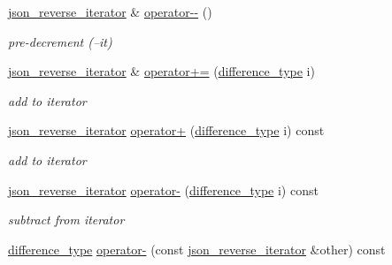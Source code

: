 \begin{DoxyCompactItemize}
\mbox{\hyperlink{classnlohmann_1_1basic__json_1_1json__reverse__iterator}{json\+\_\+reverse\+\_\+iterator}} \& \mbox{\hyperlink{classnlohmann_1_1basic__json_1_1json__reverse__iterator_ae446e535faf6bf4a20d75ffc8525d20d}{operator-\/-\/}} ()
\begin{DoxyCompactList}\small\item\em pre-\/decrement (--it) \end{DoxyCompactList}\item 
\mbox{\hyperlink{classnlohmann_1_1basic__json_1_1json__reverse__iterator}{json\+\_\+reverse\+\_\+iterator}} \& \mbox{\hyperlink{classnlohmann_1_1basic__json_1_1json__reverse__iterator_a3b884d9fc5de7013be144b304df9c068}{operator+=}} (\mbox{\hyperlink{classnlohmann_1_1basic__json_afe7c1303357e19cea9527af4e9a31d8f}{difference\+\_\+type}} i)
\begin{DoxyCompactList}\small\item\em add to iterator \end{DoxyCompactList}\item 
\mbox{\hyperlink{classnlohmann_1_1basic__json_1_1json__reverse__iterator}{json\+\_\+reverse\+\_\+iterator}} \mbox{\hyperlink{classnlohmann_1_1basic__json_1_1json__reverse__iterator_a87a33e1b5bf42674ebe9c43ac41f8660}{operator+}} (\mbox{\hyperlink{classnlohmann_1_1basic__json_afe7c1303357e19cea9527af4e9a31d8f}{difference\+\_\+type}} i) const
\begin{DoxyCompactList}\small\item\em add to iterator \end{DoxyCompactList}\item 
\mbox{\hyperlink{classnlohmann_1_1basic__json_1_1json__reverse__iterator}{json\+\_\+reverse\+\_\+iterator}} \mbox{\hyperlink{classnlohmann_1_1basic__json_1_1json__reverse__iterator_a99b0f5e39f0edc9311e28d06e4f28db8}{operator-\/}} (\mbox{\hyperlink{classnlohmann_1_1basic__json_afe7c1303357e19cea9527af4e9a31d8f}{difference\+\_\+type}} i) const
\begin{DoxyCompactList}\small\item\em subtract from iterator \end{DoxyCompactList}\item 
\mbox{\hyperlink{classnlohmann_1_1basic__json_afe7c1303357e19cea9527af4e9a31d8f}{difference\+\_\+type}} \mbox{\hyperlink{classnlohmann_1_1basic__json_1_1json__reverse__iterator_a344164ae696f1c5e672d1e7d3ac20fd9}{operator-\/}} (const \mbox{\hyperlink{classnlohmann_1_1basic__json_1_1json__reverse__iterator}{json\+\_\+reverse\+\_\+iterator}} \&other) const

\end{DoxyCompactItemize}
